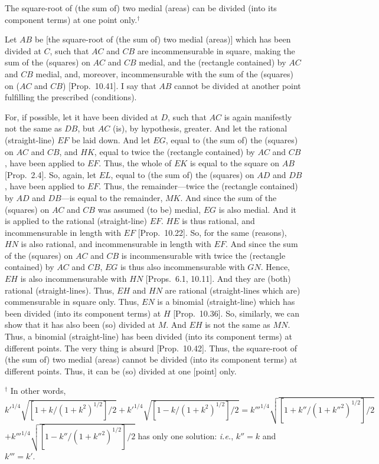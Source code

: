 \begin{Parallel}{}{}
{The square-root of (the sum of) two medial (areas) can be
divided (into its component terms) at one point only.$^\dag$

\epsfysize=2in
\centerline{}

Let $AB$ be [the square-root of (the sum of) two medial (areas)] which has been divided
at $C$, such that $AC$ and $CB$ are incommensurable in square, making the
sum of the (squares) on $AC$ and $CB$ medial, and the (rectangle contained) by $AC$ and $CB$ medial, and, moreover, incommensurable
with the sum of the (squares) on ($AC$ and $CB$) [Prop.~10.41]. I say that $AB$ cannot be divided
at another point fulfilling the prescribed (conditions).

For, if possible, let it have been divided at $D$, such that $AC$ is again
manifestly not the same as $DB$, but $AC$ (is), by hypothesis, greater.
And let the rational (straight-line) $EF$ be laid down. And let $EG$,
equal to (the sum of) the (squares) on $AC$ and $CB$, and $HK$, equal to twice the (rectangle contained) by $AC$ and $CB$,
have been applied to $EF$. Thus, the whole of $EK$ is equal to the
square on $AB$ [Prop.~2.4]. So, again, let $EL$, equal to (the sum of) the (squares)
on $AD$ and $DB$, have been applied to $EF$. Thus, the remainder---twice
the (rectangle contained) by $AD$ and $DB$---is equal to the remainder, $MK$. And since the sum of the (squares) on $AC$ and $CB$
was assumed (to be) medial, $EG$ is also medial. And it is applied
to the rational (straight-line) $EF$. $HE$ is thus rational, and incommensurable in length with $EF$ [Prop.~10.22].  So, for the same (reasons), 
$HN$ is also rational, and incommensurable in length with $EF$.
And since the sum of the (squares) on $AC$ and $CB$ is incommensurable
with twice the (rectangle contained) by $AC$ and $CB$, $EG$ is thus also
incommensurable with $GN$. Hence, $EH$ is also incommensurable with
$HN$ [Props.~6.1, 10.11].
And they are (both) rational (straight-lines). Thus, $EH$ and $HN$ are rational
(straight-lines which are) commensurable in  square only. Thus, $EN$
is a binomial (straight-line) which has been divided (into its component
terms) at $H$ [Prop.~10.36]. So, similarly, we can show that
it has also been (so) divided at $M$. And $EH$ is not the same  as $MN$. Thus,
a binomial (straight-line) has been divided (into its component
terms) at different points. The
very thing is absurd [Prop.~10.42]. Thus,
the square-root of (the sum of) two medial (areas) cannot be divided (into its component terms) at different
points. Thus, it can be (so) divided at one [point] only.}
\end{Parallel}
{\footnotesize\noindent$^\dag$ In other words, ${k'}^{1/4}\sqrt{[1+k/(1+k^2)^{1/2}]/2}
+{k'}^{1/4}\sqrt{[1-k/(1+k^2)^{1/2}]/2}={k'''}^{1/4}\sqrt{[1+k''/(1+{k''}^2)^{1/2}]/2}$\\$
+{k'''}^{1/4}\sqrt{[1-k''/(1+{k''}^2)^{1/2}]/2}$ has only one solution: {\em i.e.}, $k''=k$ and $k'''=k'$.}

